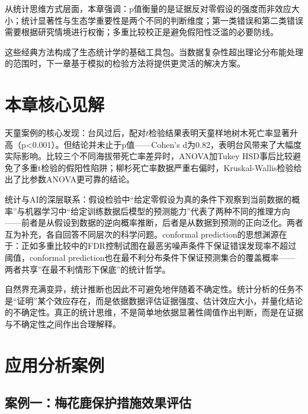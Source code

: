 \documentclass[
  twoside,12pt,fontset=none]{ctexbook}
\begin{document}
从统计思维方式层面，本章强调：p值衡量的是证据反对零假设的强度而非效应大小；统计显著性与生态学重要性是两个不同的判断维度；第一类错误和第二类错误需要根据研究情境进行权衡；多重比较校正是避免假阳性泛滥的必要防线。

这些经典方法构成了生态统计学的基础工具包。当数据复杂性超出理论分布能处理的范围时，下一章基于模拟的检验方法将提供更灵活的解决方案。

\hypertarget{ux672cux7ae0ux6838ux5fc3ux89c1ux89e3-4}{%
\section{本章核心见解}\label{ux672cux7ae0ux6838ux5fc3ux89c1ux89e3-4}}

天童案例的核心发现：台风过后，配对\(t\)检验结果表明天童样地树木死亡率显著升高（p\textless0.001）。但结论并未止于p值------Cohen's d为0.82，表明台风带来了大幅度实际影响。比较三个不同海拔带死亡率差异时，ANOVA加Tukey HSD事后比较避免了多重t检验的假阳性陷阱；柳杉死亡率数据严重右偏时，Kruskal-Wallis检验给出了比参数ANOVA更可靠的结论。

统计与AI的深层联系：假设检验中``给定零假设为真的条件下观察到当前数据的概率''与机器学习中``给定训练数据后模型的预测能力''代表了两种不同的推理方向------前者是从假设到数据的逆向概率推断，后者是从数据到预测的正向泛化。两者互为补充，各自回答不同层次的科学问题。conformal prediction的思想渊源在于：正如多重比较中的FDR控制试图在最恶劣噪声条件下保证错误发现率不超过阈值，conformal prediction也在最不利分布条件下保证预测集合的覆盖概率------两者共享''在最不利情形下保底''的统计哲学。

自然界充满变异，统计推断也因此不可避免地伴随着不确定性。统计分析的任务不是``证明''某个效应存在，而是依据数据评估证据强度、估计效应大小，并量化结论的不确定性。真正的统计思维，不是简单地依据显著性阈值作出判断，而是在证据与不确定性之间作出合理解释。

\hypertarget{ux5e94ux7528ux5206ux6790ux6848ux4f8b-4}{%
\section{应用分析案例}\label{ux5e94ux7528ux5206ux6790ux6848ux4f8b-4}}

\hypertarget{ux6848ux4f8bux4e00ux6885ux82b1ux9e7fux4fddux62a4ux63aaux65bdux6548ux679cux8bc4ux4f30}{%
\subsection{案例一：梅花鹿保护措施效果评估}\label{ux6848ux4f8bux4e00ux6885ux82b1ux9e7fux4fddux62a4ux63aaux65bdux6548ux679cux8bc4ux4f30}}
\end{document}
